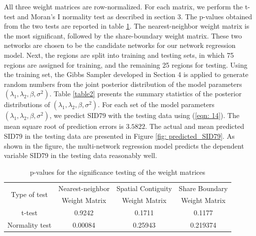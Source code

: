 \documentclass[times, doublespace]{auth}
\begin{document}
All three weight matrices are row-normalized. For each matrix, we perform the t-test and Moran's I normality test as described in section 3. The p-values obtained from the two tests are reported in table \ref{table1}. The nearest-neighbor weight matrix is the most significant, followed by the share-boundary weight matrix. These two networks are chosen to be the candidate networks for our network regression model. Next, the regions are split into training and testing sets, in which 75 regions are assigned for training, and the remaining 25 regions for testing. Using the training set, the Gibbs Sampler developed in Section 4 is applied to generate random numbers from the joint posterior distribution of the model parameters $(\lambda_{1}, \lambda_{2}, \beta, \sigma^{2})$. Table \ref{table2} presents the summary statistics of the posterior distributions of $(\lambda_{1}, \lambda_{2}, \beta, \sigma^{2})$. For each set of the model parameters $(\lambda_{1}, \lambda_{2}, \beta, \sigma^{2})$, we predict SID79 with the testing data using (\ref{eqn: 14}). The mean square root of prediction errors is $3.5822$. The actual and mean predicted SID79 in the testing data are presented in Figure \ref{fig: predicted_SID79}. As shown in the figure, the multi-network regression model predicts the dependent variable SID79 in the testing data reasonably well.
\begin{table}
	\centering
	\caption{p-values for the significance testing of the weight matrices}
	\label{table1}
	\begin{tabular}{|c|c|c|c|}
		\hline
		\multirow{ 2}{*}{Type of test} & Nearest-neighbor & Spatial Contiguity & Share Boundary\\
		& Weight Matrix & Weight Matrix & Weight Matrix\\
		\hline
		t-test & 0.9242 & 0.1711 & 0.1177\\
		\hline
		Normality test & 0.00084 & 0.25943 & 0.219374\\
		\hline
	\end{tabular}
\end{table}
\end{document}
